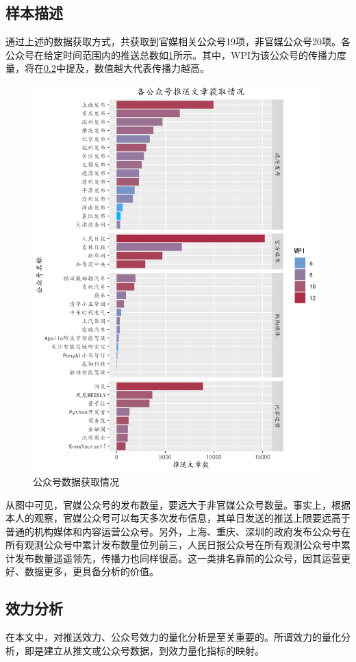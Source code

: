 \documentclass[a4paper,12pt,UTF8]{article}
\begin{document}
    \subsection{样本描述}
    通过上述的数据获取方式，共获取到官媒相关公众号19项，非官媒公众号20项。各公众号在给定时间范围内的推送总数如\cref{fig:profiles}所示。其中，WPI为该公众号的传播力度量，将在\cref{sub:xiaoli}中提及，数值越大代表传播力越高。
    \begin{figure}
      \centering
      \includegraphics[width=0.9\linewidth]{profiles.png}
      \caption{公众号数据获取情况}
      \label{fig:profiles}
    \end{figure}
    
    从图中可见，官媒公众号的发布数量，要远大于非官媒公众号数量。事实上，根据本人的观察，官媒公众号可以每天多次发布信息，其单日发送的推送上限要远高于普通的机构媒体和内容运营公众号。另外，上海、重庆、深圳的政府发布公众号在所有观测公众号中累计发布数量位列前三，人民日报公众号在所有观测公众号中累计发布数量遥遥领先，传播力也同样很高。这一类排名靠前的公众号，因其运营更好、数据更多，更具备分析的价值。
    \subsection{效力分析}
    \label{sub:xiaoli}
    在本文中，对推送效力、公众号效力的量化分析是至关重要的。所谓效力的量化分析，即是建立从推文或公众号数据，到效力量化指标的映射。
    
\end{document}
